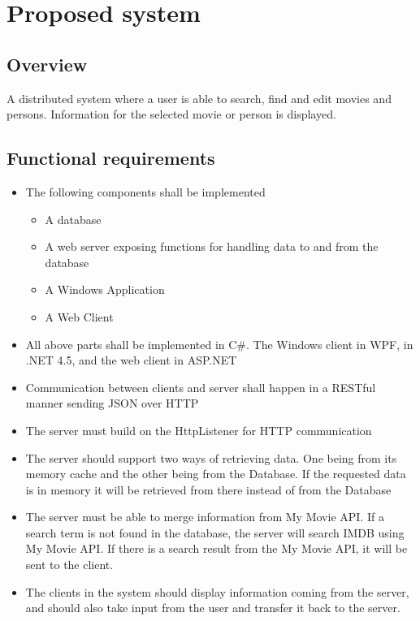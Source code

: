 \section{Proposed system}
\label{sec:proposed system}

\subsection{Overview}
A distributed system where a user is able to search, find and edit movies and persons. Information for the selected movie or person is displayed.
\subsection{Functional requirements}
\begin{itemize}
	\setlength{\itemsep}{-5pt}
	\item The following components shall be implemented
	\begin{itemize}
		\setlength{\itemsep}{-5pt}
		\item A database
		\item A web server exposing functions for handling data to and from the database
		\item A Windows Application
		\item A Web Client
	\end{itemize}
	\item All above parts shall be implemented in C\#. The Windows client in WPF, in .NET 4.5, and the web client in ASP.NET
	\item Communication between clients and server shall happen in a RESTful manner sending JSON over HTTP
	\item The server must build on the HttpListener for HTTP communication
	\item The server should support two ways of retrieving data. One being from its memory cache and the other being from the Database. If the requested data is in memory it will be retrieved from there instead of from the Database
	\item The server must be able to merge information from My Movie API. If a search term is not found in the database, the server will search IMDB using My Movie API. If there is a search result from the My Movie API, it will be sent to the client.
	\item The clients in the system should display information coming from the server, and should also take input from the user and transfer it back to the server.
\end{itemize}


